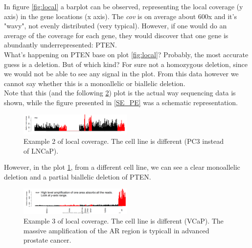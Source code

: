 In figure \ref{fig:local} a barplot can be observed, representing the local coverage (y axis) in the gene locations (x axis). The \textit{cov} is on average about 600x and it's "wavy", not evenly distributed (very typical). However, if one would do an average of the coverage for each gene, they would discover that one gene is abundantly underrepresented: PTEN.\\
What's happening on PTEN base on plot \ref{fig:local}? Probably, the most accurate guess is a deletion. But of which kind? For sure not a homozygous deletion, since we would not be able to see any signal in the plot. From this data however we cannot say whether this is a monoallelic or biallelic deletion. \\
Note that this (and the following \ref{fig:local2}) plot is the actual way sequencing data is shown, while the figure presented in \ref{SE_PE} was a schematic representation. 

\begin{figure}[htbp!]
    \centering
    \includegraphics[width=0.5\textwidth]{local_coverage1.png}
    \caption{Example 2 of local coverage. The  cell line is different (PC3 instead of LNCaP). }
    \label{fig:local1}
\end{figure}

However, in the plot \ref{fig:local1}, from a different cell line, we can see a clear monoallelic deletion and a partial biallelic deletion of PTEN.\\

\begin{figure}[htbp!]
    \centering
    \includegraphics[width=0.5\textwidth]{local_coverage2.png}
    \caption{Example 3 of local coverage. The  cell line is different (VCaP). The massive amplification of the AR region is typicall in advanced prostate cancer.}
    \label{fig:local2}
\end{figure}

